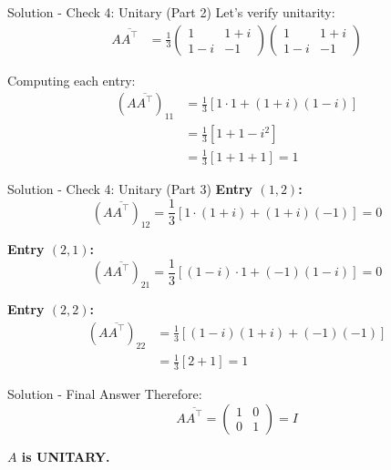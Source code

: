 \documentclass{beamer}
\newcommand{\myvec}[1]{\ensuremath{\begin{pmatrix}#1\end{pmatrix}}}
\begin{document}
	\begin{frame}{Solution - Check 4: Unitary (Part 2)}
		Let's verify unitarity:
		\begin{align}
			A\overline{A^\top} &= \frac{1}{3}\myvec{1 & 1+i \\ 1-i & -1}\myvec{1 & 1+i \\ 1-i & -1}
		\end{align}
		
		Computing each entry:
		\begin{align}
			(A\overline{A^\top})_{11} &= \frac{1}{3}\left[1 \cdot 1 + (1+i)(1-i)\right]\\
			&= \frac{1}{3}\left[1 + 1 - i^2\right]\\
			&= \frac{1}{3}[1 + 1 + 1] = 1
		\end{align}
	\end{frame}
	
	\begin{frame}{Solution - Check 4: Unitary (Part 3)}
		\textbf{Entry $(1,2)$:}
		\begin{equation}
			(A\overline{A^\top})_{12} = \frac{1}{3}\left[1 \cdot (1+i) + (1+i)(-1)\right] = 0
		\end{equation}
		
		\textbf{Entry $(2,1)$:}
		\begin{equation}
			(A\overline{A^\top})_{21} = \frac{1}{3}\left[(1-i) \cdot 1 + (-1)(1-i)\right] = 0
		\end{equation}
		
		\textbf{Entry $(2,2)$:}
		\begin{align}
			(A\overline{A^\top})_{22} &= \frac{1}{3}\left[(1-i)(1+i) + (-1)(-1)\right]\\
			&= \frac{1}{3}[2 + 1] = 1
		\end{align}
	\end{frame}
	
	\begin{frame}{Solution - Final Answer}
		Therefore:
		\begin{equation}
			A\overline{A^\top} = \myvec{1 & 0 \\ 0 & 1} = I
		\end{equation}
		
		\vspace{1em}
		\textbf{$A$ is UNITARY.}
		
		\vspace{2em}
	\end{frame}
	
\end{document}
